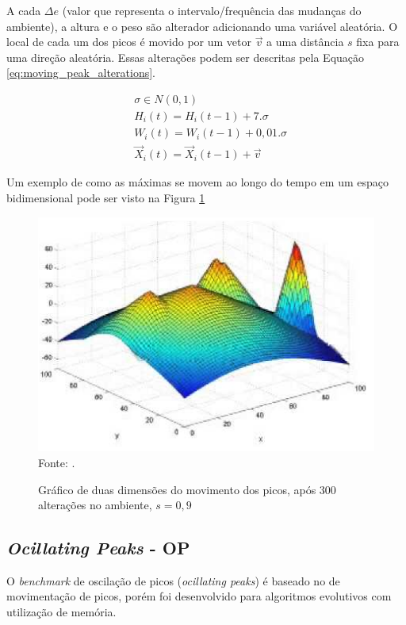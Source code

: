A cada $\Delta e$ (valor que representa o intervalo/frequência das mudanças do ambiente), a altura e o peso são alterador adicionando uma variável aleatória. O local de cada um dos picos é movido por um vetor $\vec{v}$ a uma distância $ s $ fixa para uma direção aleatória. Essas alterações podem ser descritas pela Equação \ref{eq:moving_peak_alterations}.

\begin{equation}
\label{eq:moving_peak_alterations}
\begin{split}
& \sigma \in N(0,1) \\
& H_i(t) = H_i(t-1) + 7.\sigma \\
& W_i(t) = W_i(t-1) + 0,01.\sigma \\
& \vec{X}_i(t) = \vec{X}_i(t-1) + \vec{v}
\end{split}
\end{equation}

Um exemplo de como as máximas se movem ao longo do tempo em um espaço bidimensional pode ser visto na Figura \ref{fig:moving_peaks}

\begin{figure}[!htb]
	\caption{Gráfico de duas dimensões do movimento dos picos, após 300 alterações no ambiente, $ s = 0,9 $}
	\centering
	\includegraphics[scale=0.5]{images/moving_peak.png}
	\label{fig:moving_peaks}{\\Fonte: .}
\end{figure}

\subsection{\textit{Ocillating Peaks} - OP}
\label{sec:ocillating_peaks}

O \textit{benchmark} de oscilação de picos (\textit{ocillating peaks}) é baseado no de movimentação de picos, porém foi desenvolvido para algoritmos evolutivos com utilização de memória.

